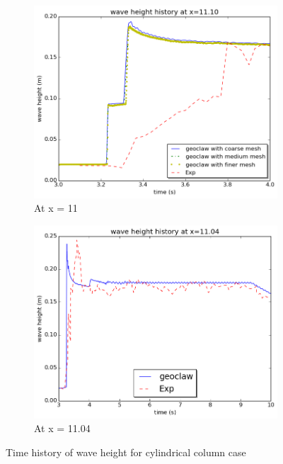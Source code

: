 \documentclass[11pt]{article}
\begin{document}
\begin{figure}[h!]
    \centering
    \begin{subfigure}[b]{0.4\textwidth}
        \includegraphics[width=1\textwidth]{./plots/waveheight_cylinder_x11_finer_new}
        \caption{At x = 11}
        \label{fig:waveheight_cylinder_x=11.0}
    \end{subfigure}
    \begin{subfigure}[b]{0.4\textwidth}
        \includegraphics[width=1\textwidth]{./plots/waveheight_cylinder_x1104_largerTimeScale}
        \caption{At x = 11.04}
        \label{fig:waveheight_cylinder_x=11.04}
    \end{subfigure}
    \caption{Time history of wave height for cylindrical column case}
\end{figure}
\end{document}
